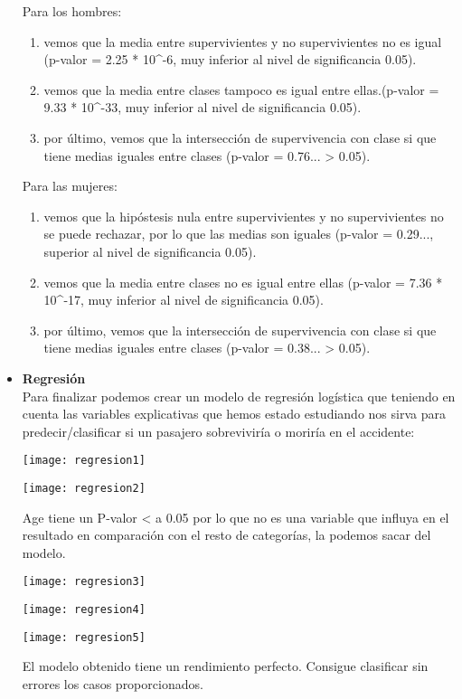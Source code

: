 \documentclass[12pt]{article}
\begin{document}
\begin{itemize}
Para los hombres:
\begin{enumerate}
\item vemos que la media entre supervivientes y no supervivientes no es igual (p-valor = 2.25 * 10\^{}-6, muy inferior al nivel de significancia 0.05).
\item vemos que la media entre clases tampoco es igual entre ellas.(p-valor = 9.33 * 10\^{}-33, muy inferior al nivel de significancia 0.05).
\item por último, vemos que la intersección de supervivencia con clase si que tiene medias iguales entre clases (p-valor = 0.76... > 0.05).
\end{enumerate}
Para las mujeres:
\begin{enumerate}
\item vemos que la hipóstesis nula entre supervivientes y no supervivientes no se puede rechazar, por lo que las medias son iguales (p-valor = 0.29..., superior al nivel de significancia 0.05).
\item vemos que la media entre clases no es igual entre ellas (p-valor = 7.36 * 10\^{}-17, muy inferior al nivel de significancia 0.05).
\item por último, vemos que la intersección de supervivencia con clase si que tiene medias iguales entre clases (p-valor = 0.38... > 0.05).\\
\end{enumerate}
\item
\textbf{Regresión}\\
Para finalizar podemos crear un modelo de regresión logística que teniendo en cuenta las variables explicativas que hemos estado estudiando nos sirva para predecir/clasificar si un pasajero sobreviviría o moriría en el accidente:
\label{imagen}
  	\begin{center}
  	\texttt{[image: regresion1]}
\end{center}
\label{imagen}
  	\begin{center}
  	\texttt{[image: regresion2]}
\end{center}

Age tiene un P-valor < a 0.05 por lo que no es una variable que influya en el resultado en comparación con el resto de categorías, la podemos sacar del modelo.
\label{imagen}
  	\begin{center}
  	\texttt{[image: regresion3]}
\end{center}
\label{imagen}
  	\begin{center}
  	\texttt{[image: regresion4]}
\end{center}
\label{imagen}
  	\begin{center}
  	\texttt{[image: regresion5]}
\end{center}

El modelo obtenido tiene un rendimiento perfecto. Consigue clasificar sin errores los casos proporcionados.
\end{itemize}
\end{document}
